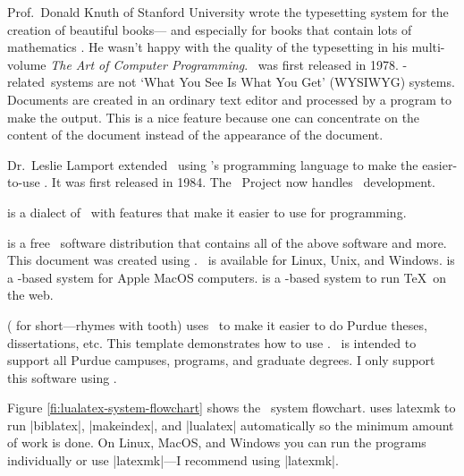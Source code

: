 Prof.~Donald Knuth
of Stanford University
wrote the \FirstTime{\TeXLogo\/}\ix{\TeX}
typesetting system
for the creation of beautiful books---%
and especially for books that contain lots of mathematics
\cite[page v]{knuth2012}.
He wasn't happy with the quality of the typesetting in his
multi-volume
\emph{The Art of Computer Programming}.
\TeXLogo\ was first released in 1978.
\TeXLogo-related\ systems are not
`What You See Is What You Get'
(WYSIWYG) systems.
Documents are created in an ordinary text editor
and processed by a program to make the output.
This is a nice feature because one can concentrate on the content
of the document instead of the appearance
of the document.

Dr.~Leslie Lamport
extended \TeXLogo\ using \TeXLogo's
programming language to make the easier-to-use {\sl\LaTeXLogo}\ix{\LaTeXLogo}.
It was first released in 1984.
The \LaTeXLogo\ Project
\cite{thelatexproject2023}
now handles \LaTeXLogo\ development.

\FirstTime{\LuaLaTeXLogo\/}\ix{\LuaLaTeXLogo}
is a dialect of \LaTeXLogo\ with features
that make it easier to use for programming.

\FirstTime{\TeXLiveLogo\/}\ix{\TeXLiveLogo}
\cite{texlive}
is a free \TeXLogo\ software distribution
that contains all of the above software and more.
This document was created using \TeXLiveLogo.
\TeXLiveLogo\ is available for Linux,
Unix,
and Windows.
\FirstTime{\MacTeXLogo\/} is a \TeXLiveLogo-based system for Apple MacOS computers.
\FirstTime{\OverleafLogo\/} is a \TeXLiveLogo-based system to run \TeX\ on the web.

\FirstTime{\PurdueThesisLogo\/}
(\FirstTime{\PuThLogo\/} for short---rhymes with tooth)
uses \LuaLaTeXLogo\ to
make it easier to do
Purdue theses,
dissertations,
etc.
This template demonstrates how to use \PurdueThesisLogo.
\PurdueThesisLogo\ is intended to support all Purdue campuses,
programs,
and graduate degrees.
I only support this software using \TeXLiveLogo.

Figure \ref{fi:lualatex-system-flowchart} shows the \LuaLaTeXLogo\ system flowchart.
\cite{overleaf}
uses latexmk
\cite{latexmk}
to run
|biblatex|,
|makeindex|,
and |lualatex| automatically
so the minimum amount of work is done.
On Linux,
MacOS,
and Windows you can run the programs individually
or use |latexmk|---I recommend using |latexmk|.

